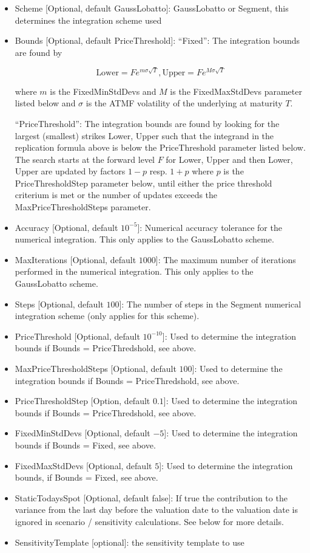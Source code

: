 \begin{itemize}
\item Scheme [Optional, default GaussLobatto]: GaussLobatto or Segment, this determines the integration scheme used
\item Bounds [Optional, default PriceThreshold]: ``Fixed'': The integration bounds are found by
  
  $$
  \text{Lower} = F e ^ {m \sigma \sqrt{T}},  \text{Upper} = F e ^ {M \sigma \sqrt{T}}
  $$

  where $m$ is the FixedMinStdDevs and $M$ is the FixedMaxStdDevs parameter listed below and $\sigma$ is the ATMF
  volatility of the underlying at maturity $T$.

  ``PriceThreshold'': The integration bounds are found by looking for the largest (smallest) strikes Lower, Upper such
  that the integrand in the replication formula above is below the PriceThreshold parameter listed below. The search
  starts at the forward level $F$ for Lower, Upper and then Lower, Upper are updated by factors $1-p$ resp. $1+p$ where
  $p$ is the PriceThresholdStep parameter below, until either the price threshold criterium is met or the number of
  updates exceeds the MaxPriceThresholdSteps parameter.

\item Accuracy [Optional, default $10^{-5}$]: Numerical accuracy tolerance for the numerical integration. This only
  applies to the GaussLobatto scheme.
\item MaxIterations [Optional, default $1000$]: The maximum number of iterations performed in the numerical
  integration. This only applies to the GaussLobatto scheme.
\item Steps [Optional, default $100$]: The number of steps in the Segment numerical integration scheme (only applies for
  this scheme).
\item PriceThreshold [Optional, default $10^{-10}$]: Used to determine the integration bounds if Bounds = PriceThredshold, see above.
\item MaxPriceThresholdSteps [Optional, default $100$]: Used to determine the integration bounds if Bounds = PriceThredshold, see above.
\item PriceThresholdStep [Option, default $0.1$]: Used to determine the integration bounds if Bounds = PriceThredshold, see above.
\item FixedMinStdDevs [Optional, default $-5$]: Used to determine the integration bounds if Bounds = Fixed, see above.
\item FixedMaxStdDevs [Optional, default $5$]: Used to determine the integration bounds, if Bounds = Fixed, see above.
\item StaticTodaysSpot [Optional, default false]: If true the contribution to the variance from the last day before the
  valuation date to the valuation date is ignored in scenario / sensitivity calculations. See below for more details.
\item SensitivityTemplate [optional]: the sensitivity template to use 
\end{itemize}

